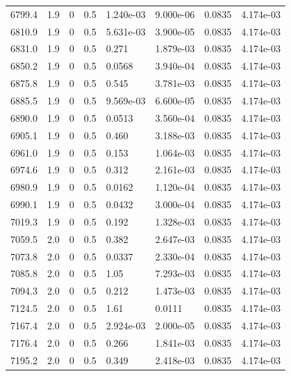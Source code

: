 \documentclass[preview]{standalone}
\begin{document}
{{{{{{{\begin{tabular}{L{1.2cm}C{1.2cm} C{0.3cm}C{0.5cm} C{1.4cm}C{1.4cm} C{1.4cm}C{1.4cm}}
  6799.4  &   1.9  & 0     & 0.5 &  1.240e-03  & 9.000e-06  & 0.0835 &  4.174e-03   \\ 
  6810.9  &   1.9  & 0     & 0.5 &  5.631e-03  & 3.900e-05  & 0.0835 &  4.174e-03   \\ 
  6831.0  &   1.9  & 0     & 0.5 &  0.271  & 1.879e-03  & 0.0835 &  4.174e-03   \\ 
  6850.2  &   1.9  & 0     & 0.5 &  0.0568  & 3.940e-04  & 0.0835 &  4.174e-03   \\ 
  6875.8  &   1.9  & 0     & 0.5 &  0.545  & 3.781e-03  & 0.0835 &  4.174e-03   \\ 
  6885.5  &   1.9  & 0     & 0.5 &  9.569e-03  & 6.600e-05  & 0.0835 &  4.174e-03   \\ 
  6890.0  &   1.9  & 0     & 0.5 &  0.0513  & 3.560e-04  & 0.0835 &  4.174e-03   \\ 
  6905.1  &   1.9  & 0     & 0.5 &  0.460  & 3.188e-03  & 0.0835 &  4.174e-03   \\ 
  6961.0  &   1.9  & 0     & 0.5 &  0.153  & 1.064e-03  & 0.0835 &  4.174e-03   \\ 
  6974.6  &   1.9  & 0     & 0.5 &  0.312  & 2.161e-03  & 0.0835 &  4.174e-03   \\ 
  6980.9  &   1.9  & 0     & 0.5 &  0.0162  & 1.120e-04  & 0.0835 &  4.174e-03   \\ 
  6990.1  &   1.9  & 0     & 0.5 &  0.0432  & 3.000e-04  & 0.0835 &  4.174e-03   \\ 
  7019.3  &   1.9  & 0     & 0.5 &  0.192  & 1.328e-03  & 0.0835 &  4.174e-03   \\ 
  7059.5  &   2.0  & 0     & 0.5 &  0.382  & 2.647e-03  & 0.0835 &  4.174e-03   \\ 
  7073.8  &   2.0  & 0     & 0.5 &  0.0337  & 2.330e-04  & 0.0835 &  4.174e-03   \\ 
  7085.8  &   2.0  & 0     & 0.5 &  1.05  & 7.293e-03  & 0.0835 &  4.174e-03   \\ 
  7094.3  &   2.0  & 0     & 0.5 &  0.212  & 1.473e-03  & 0.0835 &  4.174e-03   \\ 
  7124.5  &   2.0  & 0     & 0.5 &  1.61  & 0.0111  & 0.0835 &  4.174e-03   \\ 
  7167.4  &   2.0  & 0     & 0.5 &  2.924e-03  & 2.000e-05  & 0.0835 &  4.174e-03   \\ 
  7176.4  &   2.0  & 0     & 0.5 &  0.266  & 1.841e-03  & 0.0835 &  4.174e-03   \\ 
  7195.2  &   2.0  & 0     & 0.5 &  0.349  & 2.418e-03  & 0.0835 &  4.174e-03   \\ 

\end{tabular}}}}}}}}
\end{document}
